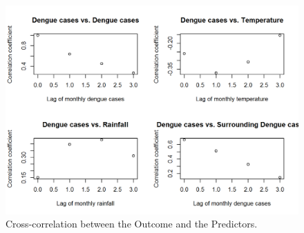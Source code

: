 \documentclass{bmcart}
\begin{document}
\begin{figure}[htbp]
	\begin{center}
		\includegraphics[width=120mm]{23-Cross-Cor-1}
		\caption{Cross-correlation between the Outcome and the Predictors.}
		\label{figure-Cross-Cor-1}
	\end{center}
\end{figure} 
 








\end{document}
